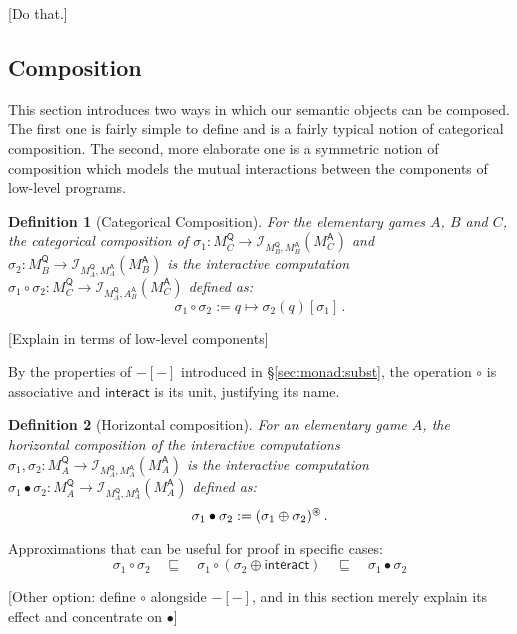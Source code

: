 \documentclass{article}
\newtheorem{definition}{Definition}
\newcommand{\kw}[1]{\ensuremath{ \mathsf{#1} }}
\begin{document}
[Do that.]


\subsection{Composition} \label{sec:modsem:comp} %

This section introduces two ways in which
our semantic objects can be composed.
The first one is fairly simple to define
and is a fairly typical notion of categorical composition.
The second, more elaborate one
is a symmetric notion of composition which
models the mutual interactions
between the components of low-level programs.

\begin{definition}[Categorical Composition]
For the elementary games $A$, $B$ and $C$,
the \emph{categorical composition} of
$\sigma_1 : M_C^\kw{Q} \rightarrow
 \mathcal{I}_{M_B^\kw{Q},M_B^\kw{A}}(M_C^\kw{A})$ and
$\sigma_2 : M_B^\kw{Q} \rightarrow
 \mathcal{I}_{M_A^\kw{Q},M_A^\kw{A}}(M_B^\kw{A})$
is the interactive computation
$\sigma_1 \circ \sigma_2 : M_C^\kw{Q} \rightarrow
 \mathcal{I}_{M_A^\kw{Q},A_B^\kw{A}}(M_C^\kw{A})$
defined as:
\[
    \sigma_1 \circ \sigma_2 := q \mapsto \sigma_2(q)[\sigma_1] \,.
\]
\end{definition}

[Explain in terms of low-level components]

By the properties of $-[-]$ introduced in \S\ref{sec:monad:subst},
the operation $\circ$ is associative and
$\kw{interact}$ is its unit,
justifying its name.

\begin{definition}[Horizontal composition]
For an elementary game $A$,
the \emph{horizontal composition} of the interactive computations
$\sigma_1, \sigma_2 : M_A^\kw{Q} \rightarrow
 \mathcal{I}_{M_A^\kw{Q},M_A^\kw{A}}(M_A^\kw{A})$
is the interactive computation
$\sigma_1 \bullet \sigma_2 : M_A^\kw{Q} \rightarrow
 \mathcal{I}_{M_A^\kw{Q},M_A^\kw{A}}(M_A^\kw{A})$
defined as:
\[
    \sigma_1 \bullet \sigma_2 :=
      (\sigma_1 \oplus \sigma_2)^\oast \,.
\]
\end{definition}

Approximations that can be useful for proof in specific cases:
\[
    \sigma_1 \circ \sigma_2 \quad \sqsubseteq \quad
    \sigma_1 \circ (\sigma_2 \oplus \kw{interact}) \quad \sqsubseteq \quad
    \sigma_1 \bullet \sigma_2
\]

[Other option:
define $\circ$ alongside $-[-]$, and
in this section merely explain its effect and concentrate on $\bullet$]
\end{document}
